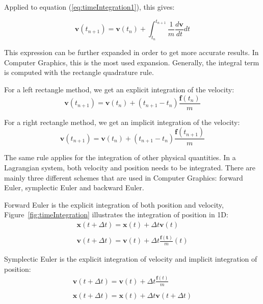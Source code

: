 Applied to equation (\ref{eq:timeIntegration1}), this gives:

\begin{equation}
\label{eq:timeIntegration2}
\displaystyle
\mathbf{v}(t_{n+1}) = \mathbf{v}(t_{n}) + \int_{t_{n}}^{t_{n+1}}\frac{1}{m}\frac{d\mathbf{v}}{dt} dt
\end{equation}

This expression can be further expanded in order to get more accurate results. 
In Computer Graphics, this is the most used expansion. 
Generally, the integral term is computed with the rectangle quadrature rule.

For a left rectangle method, we get an explicit integration of the velocity:
\begin{equation}
\label{eq:explicitIntegration}
\mathbf{v}(t_{n+1}) = \mathbf{v}(t_{n}) + \left(t_{n+1}-t_{n}\right) \frac{\mathbf{f}(t_{n})}{m}
\end{equation}

For a right rectangle method, we get an implicit integration of the velocity:
\begin{equation}
\label{eq:implicitIntegration}
\mathbf{v}(t_{n+1}) = \mathbf{v}(t_{n}) + \left(t_{n+1}-t_{n}\right) \frac{\mathbf{f}(t_{n+1})}{m}
\end{equation}

The same rule applies for the integration of other physical quantities. In a Lagrangian system, both velocity and position needs to be integrated. There are mainly three different schemes that are used in Computer Graphics: forward Euler, symplectic Euler and backward Euler.

Forward Euler is the explicit integration of both position and velocity,
Figure~\ref{fig:timeIntegration} illustrates the integration of position in 1D:
\begin{equation}
\label{eq:explicitEuler}
\begin{array}{l}
\displaystyle \mathbf{x}(t+\Delta t) = \mathbf{x}(t) + \Delta t \mathbf{v}(t) \\ \\
\displaystyle \mathbf{v}(t+\Delta t) = \mathbf{v}(t) + \Delta t \frac{\mathbf{f(t)}}{m}(t)
\end{array}
\end{equation}

Symplectic Euler is the explicit integration of velocity and implicit integration of position:
\begin{equation}
\label{eq:symplecticEuler}
\begin{array}{l}
\displaystyle \mathbf{v}(t+\Delta t) = \mathbf{v}(t) + \Delta t \frac{\mathbf{f}(t)}{m} \\ \\
\displaystyle \mathbf{x}(t+\Delta t) = \mathbf{x}(t) + \Delta t \mathbf{v}(t+\Delta t)
\end{array}
\end{equation}

